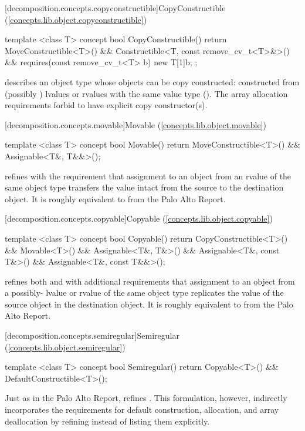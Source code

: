[decomposition.concepts.copyconstructible]{CopyConstructible (\ref{concepts.lib.object.copyconstructible})}
\begin{codeblock}
template <class T>
concept bool CopyConstructible() {
  return MoveConstructible<T>() &&
    Constructible<T, const remove_cv_t<T>&>() &&
    requires(const remove_cv_t<T> b) {
      new T[1]{b};
    };
}
\end{codeblock}
 describes an object type  whose objects can be copy constructed:
constructed from (possibly ) lvalues or  rvalues with the same value type
(). The array allocation requirements forbid  to have explicit
copy constructor(s).

[decomposition.concepts.movable]{Movable (\ref{concepts.lib.object.movable})}
\begin{codeblock}
template <class T>
concept bool Movable() {
  return MoveConstructible<T>() &&
    Assignable<T&, T&&>();
}
\end{codeblock}
 refines  with the requirement that assignment to an object
from an rvalue of the same object type transfers the value intact from the source to the destination
object. It is roughly equivalent to  from the Palo Alto Report.

[decomposition.concepts.copyable]{Copyable (\ref{concepts.lib.object.copyable})}
\begin{codeblock}
template <class T>
concept bool Copyable() {
  return CopyConstructible<T>() &&
    Movable<T>() &&
    Assignable<T&, T&>() &&
    Assignable<T&, const T&>() &&
    Assignable<T&, const T&&>();
}
\end{codeblock}
 refines both  and  with additional
requirements that assignment to an object from a possibly- lvalue or 
rvalue of the same object type replicates the value of the source object in the destination object.
It is roughly equivalent to  from the Palo Alto Report.

[decomposition.concepts.semiregular]{Semiregular (\ref{concepts.lib.object.semiregular})}
\begin{codeblock}
template <class T>
concept bool Semiregular() {
  return Copyable<T>() &&
    DefaultConstructible<T>();
}
\end{codeblock}
Just as in the Palo Alto Report,  refines . This formulation,
however, indirectly incorporates the requirements for default construction, allocation, and array
deallocation by refining  instead of listing them explicitly.


